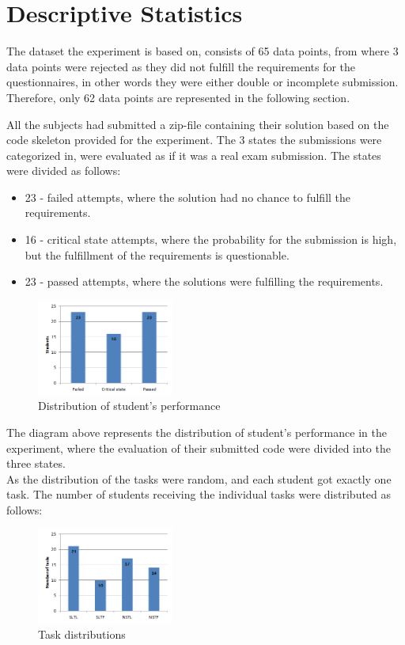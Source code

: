 \documentclass{sig-alternate-05-2015}
\begin{document}
\section{Descriptive Statistics}
The dataset the experiment is based on, consists of 65 data points, from where 3 data points were rejected as they did not fulfill the requirements for the questionnaires, in other words they were either double or incomplete submission. Therefore, only 62 data points are represented in the following section.

All the subjects had submitted a zip-file containing their solution based on the code skeleton provided for the experiment. The 3 states the submissions were categorized in, were evaluated as if it was a real exam submission.
The states were divided as follows:

\begin{itemize}
	\item 23 - failed attempts, where the solution had no chance to fulfill the requirements.
	\item 16 - critical state attempts, where the probability for the submission is high, but the fulfillment of the requirements is questionable.
	\item 23 - passed attempts, where the solutions were fulfilling the requirements.
\end{itemize}

\begin{figure}[H]
	\centering
	\includegraphics[width=0.4\textwidth]{img01}
	\caption{Distribution of student's performance}
\end{figure}

The diagram above represents the distribution of student's performance in the experiment, where the evaluation of their submitted code were divided into the three states.\\

As the distribution of the tasks were random, and each student got exactly one task. The number of students receiving the individual tasks were distributed as follows:

\begin{figure}[H]
	\centering
	\includegraphics[width=0.4\textwidth]{img02}
	\caption{Task distributions}
\end{figure}
\end{document}

